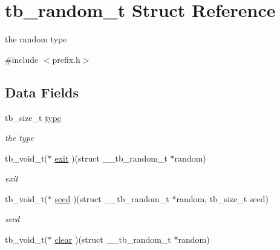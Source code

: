 \hypertarget{structtb__random__t}{\section{tb\-\_\-random\-\_\-t Struct Reference}
\label{structtb__random__t}
}


the random type  




{\ttfamily \#include $<$prefix.\-h$>$}

\subsection*{Data Fields}
\begin{DoxyCompactItemize}
\item 
\hypertarget{structtb__random__t_a3004090c6f61565f71598d700f50fb5d}{tb\-\_\-size\-\_\-t \hyperlink{structtb__random__t_a3004090c6f61565f71598d700f50fb5d}{type}}\label{structtb__random__t_a3004090c6f61565f71598d700f50fb5d}

\begin{DoxyCompactList}\small\item\em the type \end{DoxyCompactList}\item 
\hypertarget{structtb__random__t_ac51a1d96a90c0ca7766566b1280fbf17}{tb\-\_\-void\-\_\-t($\ast$ \hyperlink{structtb__random__t_ac51a1d96a90c0ca7766566b1280fbf17}{exit} )(struct \-\_\-\-\_\-tb\-\_\-random\-\_\-t $\ast$random)}\label{structtb__random__t_ac51a1d96a90c0ca7766566b1280fbf17}

\begin{DoxyCompactList}\small\item\em exit \end{DoxyCompactList}\item 
\hypertarget{structtb__random__t_a7a7c6ce2ac5367c33ef520625e4156d6}{tb\-\_\-void\-\_\-t($\ast$ \hyperlink{structtb__random__t_a7a7c6ce2ac5367c33ef520625e4156d6}{seed} )(struct \-\_\-\-\_\-tb\-\_\-random\-\_\-t $\ast$random, tb\-\_\-size\-\_\-t seed)}\label{structtb__random__t_a7a7c6ce2ac5367c33ef520625e4156d6}

\begin{DoxyCompactList}\small\item\em seed \end{DoxyCompactList}\item 
\hypertarget{structtb__random__t_a40baeb0034e31611ede84d4eb9ba988c}{tb\-\_\-void\-\_\-t($\ast$ \hyperlink{structtb__random__t_a40baeb0034e31611ede84d4eb9ba988c}{clear} )(struct \-\_\-\-\_\-tb\-\_\-random\-\_\-t $\ast$random)}\label{structtb__random__t_a40baeb0034e31611ede84d4eb9ba988c}


\end{DoxyCompactItemize}
